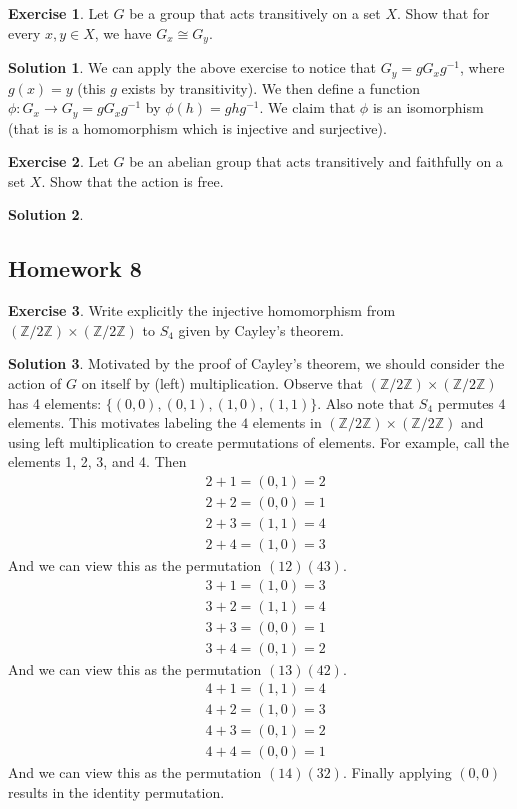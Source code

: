 \documentclass[12pt]{article}
\theoremstyle{definition}
\newcommand{\Z}{\mathbb{Z}}
\newtheorem{exercise}{\color{YellowOrange}Exercise}
\theoremstyle{definition}
\newtheorem{solution}{\color{Goldenrod}Solution}
\begin{document}
\begin{exercise}
	Let $G$ be a group that acts transitively on a set $X$. Show that for every $x,y \in X$, we have $G_x \cong G_y$. 
\end{exercise}
\begin{solution}
	We can apply the above exercise to notice that $G_y = gG_xg^{-1}$, where $g(x) = y$ (this $g$ exists by transitivity). We then define a function $\phi : G_x \to G_y = gG_xg^{-1}$ by $\phi(h) = ghg^{-1}$. We claim that $\phi$ is an isomorphism (that is is a homomorphism which is injective and surjective). 
\end{solution}

\begin{exercise}
Let $G$ be an abelian group that acts transitively and faithfully on a set $X$. Show that the action is free. 
\end{exercise}
\begin{solution}
\end{solution}

\subsection{Homework 8}
\begin{exercise}
	Write explicitly the injective homomorphism from $(\Z/2 \Z) \times (\Z/2 \Z)$ to $S_4$ given by Cayley's theorem. 
\end{exercise}
\begin{solution}
	Motivated by the proof of Cayley's theorem, we should consider the action of $G$ on itself by (left) multiplication. Observe that $(\Z/2 \Z) \times (\Z/2 \Z)$ has 4 elements: $\{(0,0),(0,1),(1,0),(1,1)\}$. Also note that $S_4$ permutes $4$ elements. This motivates labeling the $4$ elements in $(\Z/2 \Z) \times (\Z/2 \Z)$  and using left multiplication to create permutations of elements. For example, call the elements 1, 2, 3, and 4. Then
	\begin{align*}
	&2 + 1 = (0,1) = 2\\
	&2 + 2 = (0,0) = 1\\
	&2 + 3 = (1,1) = 4\\
	&2 + 4 = (1,0) = 3 
	\end{align*}
	And we can view this as the permutation $(12)(43)$.
	\begin{align*}
	&3 + 1 = (1,0) = 3\\
	&3 + 2 = (1,1) = 4\\
	&3 + 3 = (0,0) = 1\\
	&3 + 4 = (0,1) = 2 
	\end{align*}
	And we can view this as the permutation $(13)(42)$.
	\begin{align*}
	&4 + 1 = (1,1) = 4\\
	&4 + 2 = (1,0) = 3\\
	&4 + 3 = (0,1) = 2\\
	&4 + 4 = (0,0) = 1 
	\end{align*}
	And we can view this as the permutation $(14)(32)$. Finally applying $(0,0)$ results in the identity permutation. 
 \end{solution}
\end{document}

